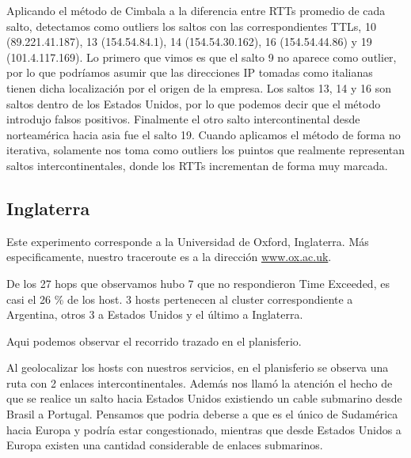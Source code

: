 Aplicando el método de Cimbala a la diferencia entre RTTs promedio de cada salto, detectamos como outliers los saltos con las correspondientes TTLs, 10 (89.221.41.187), 13 (154.54.84.1), 14 (154.54.30.162), 16 (154.54.44.86) y 19 (101.4.117.169). Lo primero que vimos es que el salto 9 no aparece como outlier, por lo que podríamos asumir que las direcciones IP tomadas como italianas tienen dicha localización por el origen de la empresa. Los saltos 13, 14 y 16 son saltos dentro de los Estados Unidos, por lo que podemos decir que el método introdujo falsos positivos. Finalmente el otro salto intercontinental desde norteamérica hacia asia fue el salto 19. Cuando aplicamos el método de forma no iterativa, solamente nos toma como outliers los puintos que realmente representan saltos intercontinentales, donde los RTTs incrementan de forma muy marcada.

\subsection{Inglaterra}

Este experimento corresponde a la Universidad de Oxford, Inglaterra. Más especificamente, nuestro traceroute es a la dirección \url{www.ox.ac.uk}.

De los 27 hops que observamos hubo 7 que no respondieron Time Exceeded, es casi el 26 \% de los host. 3 hosts pertenecen al cluster correspondiente a Argentina, otros 3 a Estados Unidos y el último a Inglaterra.

Aqui podemos observar el recorrido trazado en el planisferio.

Al geolocalizar los hosts con nuestros servicios, en el planisferio se observa una ruta con 2 enlaces intercontinentales. Además nos llamó la atención el hecho de que se realice un salto hacia Estados Unidos existiendo un cable submarino desde Brasil a Portugal. Pensamos que podria deberse a que es el único de Sudamérica hacia Europa y podría estar congestionado, mientras que desde Estados Unidos a Europa existen una cantidad considerable de enlaces submarinos.


